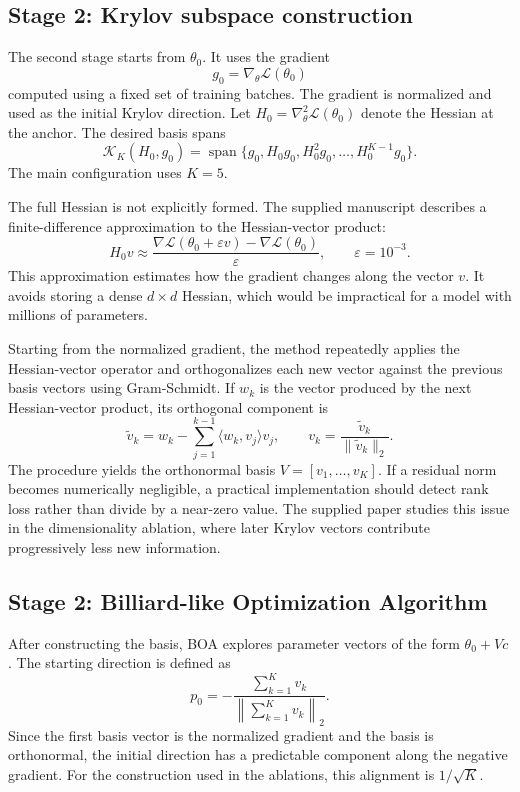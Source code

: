 \documentclass[11pt,a4paper]{article}
\newcommand{\Krylov}{\mathcal{K}}
\begin{document}
\subsection{Stage 2: Krylov subspace construction}
The second stage starts from $\theta_0$. It uses the gradient
\begin{equation}
 g_0=\nabla_\theta\mathcal{L}(\theta_0)
 \label{eq:g0}
\end{equation}
computed using a fixed set of training batches. The gradient is normalized and used as the initial Krylov direction. Let $H_0=\nabla^2_\theta\mathcal{L}(\theta_0)$ denote the Hessian at the anchor. The desired basis spans
\begin{equation}
 \Krylov_K(H_0,g_0)=\operatorname{span}
 \{g_0,H_0g_0,H_0^2g_0,\ldots,H_0^{K-1}g_0\}.
 \label{eq:krylov_basis}
\end{equation}
The main configuration uses $K=5$.

The full Hessian is not explicitly formed. The supplied manuscript describes a finite-difference approximation to the Hessian-vector product:
\begin{equation}
 H_0v\approx\frac{\nabla\mathcal{L}(\theta_0+\varepsilon v)
 -\nabla\mathcal{L}(\theta_0)}{\varepsilon},
 \qquad \varepsilon=10^{-3}.
 \label{eq:finite_difference_hvp}
\end{equation}
This approximation estimates how the gradient changes along the vector $v$. It avoids storing a dense $d\times d$ Hessian, which would be impractical for a model with millions of parameters.

Starting from the normalized gradient, the method repeatedly applies the Hessian-vector operator and orthogonalizes each new vector against the previous basis vectors using Gram-Schmidt. If $w_k$ is the vector produced by the next Hessian-vector product, its orthogonal component is
\begin{equation}
 \widetilde{v}_k=w_k-\sum_{j=1}^{k-1}
 \langle w_k,v_j\rangle v_j,
 \qquad
 v_k=\frac{\widetilde{v}_k}{\|\widetilde{v}_k\|_2}.
 \label{eq:gram_schmidt}
\end{equation}
The procedure yields the orthonormal basis $V=[v_1,\ldots,v_K]$. If a residual norm becomes numerically negligible, a practical implementation should detect rank loss rather than divide by a near-zero value. The supplied paper studies this issue in the dimensionality ablation, where later Krylov vectors contribute progressively less new information.

\subsection{Stage 2: Billiard-like Optimization Algorithm}
After constructing the basis, BOA explores parameter vectors of the form $\theta_0+Vc$. The starting direction is defined as
\begin{equation}
 p_0=-\frac{\sum_{k=1}^{K}v_k}
 {\left\|\sum_{k=1}^{K}v_k\right\|_2}.
 \label{eq:p0}
\end{equation}
Since the first basis vector is the normalized gradient and the basis is orthonormal, the initial direction has a predictable component along the negative gradient. For the construction used in the ablations, this alignment is $1/\sqrt{K}$.
\end{document}
